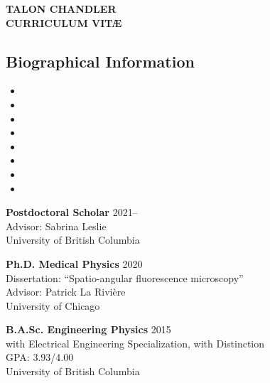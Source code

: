\documentclass[12pt,letterpaper]{article}
\begin{document}
\begin{center}
{\Large \textbf{TALON CHANDLER}}\\
{\textbf{CURRICULUM VIT\AE}}\\
\end{center}

\vspace{-1em}

\subsection*{Biographical Information}
\begin{itemize}[noitemsep]
\item[]  
\item[]  
\item[]  
\item[] \itab{} 
\item[] \itab{} 
\item[]  
\item[]  
\item[]  
\end{itemize}

\begin{benumerate}{1}
  \item[] \textbf{Postdoctoral Scholar} \hfill 2021--\\
  Advisor: Sabrina Leslie \\
  University of British Columbia
\end{benumerate}

\begin{benumerate}{2}
\item
  \textbf{Ph.D. Medical Physics} \hfill 2020\\
  Dissertation: ``Spatio-angular fluorescence microscopy''\\
  Advisor: Patrick La Rivi\`ere \\
  University of Chicago
\item
  \textbf{B.A.Sc. Engineering Physics} \hfill 2015\\
  with Electrical Engineering Specialization, with Distinction\\
  GPA: 3.93/4.00\\
  University of British Columbia
\end{benumerate}
\end{document}
